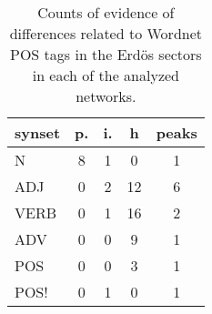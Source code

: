 \begin{table}[h!]
\begin{center}
\begin{tabular}{| l | c | c | c | c |}\hline
synset & p. & i. & h & peaks \\\hline
N & 8  & 1  & 0  & 1 \\\hline
ADJ & 0  & 2  & 12  & 6 \\\hline
VERB & 0  & 1  & 16  & 2 \\\hline
ADV & 0  & 0  & 9  & 1 \\\hline
POS & 0  & 0  & 3  & 1 \\\hline
POS! & 0  & 1  & 0  & 1 \\\hline
\end{tabular}
\caption{Counts of evidence of differences related to Wordnet POS tags in the Erd\"os sectors in each of the analyzed networks.}
\end{center}
\end{table}